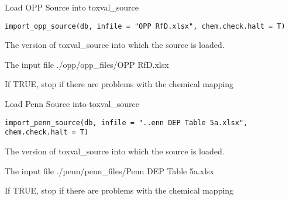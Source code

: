 \documentclass[letterpaper]{book}
\begin{document}
%
\begin{Description}\relax
Load OPP Source into toxval\_source
\end{Description}
%
\begin{Usage}
\begin{verbatim}
import_opp_source(db, infile = "OPP RfD.xlsx", chem.check.halt = T)
\end{verbatim}
\end{Usage}
%
\begin{Arguments}
\begin{ldescription}
\item[\code{db}] The version of toxval\_source into which the source is loaded.

\item[\code{infile}] The input file ./opp/opp\_files/OPP RfD.xlsx

\item[\code{chem.check.halt}] If TRUE, stop if there are problems with the chemical mapping
\end{ldescription}
\end{Arguments}
%
\begin{Description}\relax
Load Penn Source into toxval\_source
\end{Description}
%
\begin{Usage}
\begin{verbatim}
import_penn_source(db, infile = "..enn DEP Table 5a.xlsx", chem.check.halt = T)
\end{verbatim}
\end{Usage}
%
\begin{Arguments}
\begin{ldescription}
\item[\code{db}] The version of toxval\_source into which the source is loaded.

\item[\code{infile}] The input file ./penn/penn\_files/Penn DEP Table 5a.xlsx

\item[\code{chem.check.halt}] If TRUE, stop if there are problems with the chemical mapping
\end{ldescription}
\end{Arguments}
\end{document}
